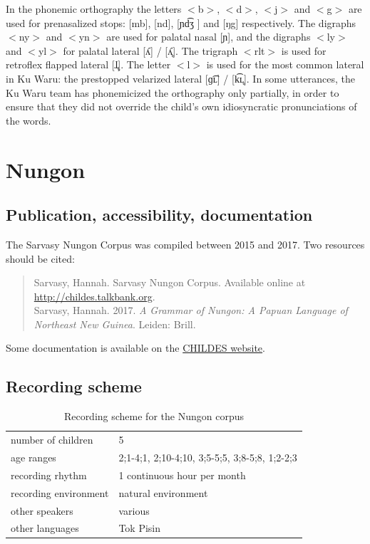\documentclass[a4paper, 11pt]{book}
\begin{document}
In the phonemic orthography the letters $<$b$>$, $<$d$>$, $<$j$>$ and $<$g$>$ are used for prenasalized stops: [mb], [nd], [ɲd͡ʒ ] and [ŋg] respectively.  The digraphs $<$ny$>$ and $<$yn$>$ are used for palatal nasal [ɲ], and the digraphs $<$ly$>$ and $<$yl$>$ for palatal lateral [ʎ] / [ʎ̥]. The trigraph $<$rlt$>$ is used for retroflex flapped lateral [ɺ̢]. The letter $<$l$>$ is used for the most common lateral in Ku Waru: the prestopped velarized lateral [ɡ͡ʟ] / [k͡ʟ̥]. In some utterances, the Ku Waru team has phonemicized the orthography only partially, in order to ensure that they did not override the child's own idiosyncratic pronunciations of the words.


\section{Nungon}
\label{sec:Nungon}

\subsection{Publication, accessibility, documentation}
The Sarvasy Nungon Corpus \citep{Sarvasy2017a, Sarvasy2017b} was compiled between 2015 and 2017. Two resources should be cited: 

\begin{quote}
	Sarvasy, Hannah. Sarvasy Nungon Corpus. Available online at \href{http://childes.talkbank.org/access/Other/Nungon/Sarvasy.html}{http://childes.talkbank.org}. \\ %
	Sarvasy, Hannah. 2017. \emph{A Grammar of Nungon: A Papuan Language of Northeast New Guinea}. Leiden: Brill. %
\end{quote}

\noindent Some documentation is available on the \href{http://childes.talkbank.org/access/Other/Nungon/Sarvasy.html}{CHILDES website}. 

\subsection{Recording scheme}

\begin{table}[ht]
	\centering
	\begin{tabular}{ll}
		\toprule
		number of children 	& 5 \\
		age ranges 			& 2;1-4;1, 2;10-4;10, 3;5-5;5, 3;8-5;8, 1;2-2;3 \\
		recording rhythm 	& 1 continuous hour per month \\
		recording environment & natural environment \\
		other speakers 		& various \\
		other languages		& Tok Pisin \\
		\bottomrule
	\end{tabular}
	\caption{Recording scheme for the Nungon corpus}
	\label{tab:Nungon recording scheme}
\end{table}
\end{document}
